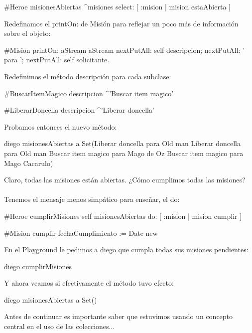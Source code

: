 \documentclass[a4paper,12pt]{book}
\begin{document}
\begin{code}
#Heroe
misionesAbiertas
  ^misiones select: [ :mision | mision estaAbierta ] 
\end{code}

Redefinamos el printOn: de Misión para reflejar un poco más de información sobre el objeto:

\begin{code}
#Mision
printOn: aStream
   aStream nextPutAll: self descripcion;
		nextPutAll: ' para ';
		nextPutAll: self solicitante.
\end{code}

Redefinimos el método descripción para cada subclase:

\begin{code}
#BuscarItemMagico
descripcion
  ^'Buscar item magico'

#LiberarDoncella
descripcion
  ^'Liberar doncella'
\end{code}
  
Probamos entonces el nuevo método:

\begin{code}
diego misionesAbiertas
   a Set(Liberar doncella para Old man 
         Liberar doncella para Old man 
         Buscar item magico para Mago de Oz 
         Buscar item magico para Mago Cacarulo)
\end{code}

Claro, todas las misiones están abiertas. ¿Cómo cumplimos todas las misiones?
\\
\\
Tenemos el mensaje menos simpático para enseñar, el do:

\begin{code}
#Heroe
cumplirMisiones
  self misionesAbiertas do: [ :mision | mision cumplir ] 
  
#Mision
cumplir
  fechaCumplimiento := Date new
\end{code}

En el Playground le pedimos a diego que cumpla todas sus misiones pendientes:

\begin{code}
diego cumplirMisiones
\end{code}

Y ahora veamos si efectivamente el método tuvo efecto:

\begin{code}
diego misionesAbiertas
      a Set()
\end{code}

Antes de continuar es importante saber que estuvimos usando un concepto central en el uso de las colecciones...
\\
\end{document}
